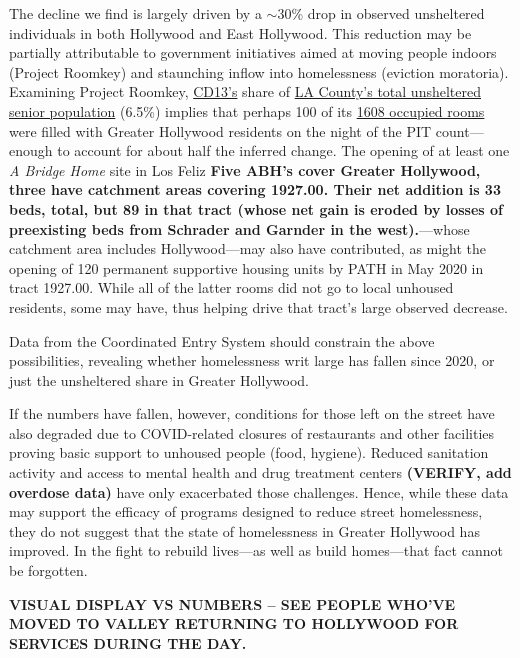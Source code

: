 \documentclass[11pt]{article}
\def\bfr{\bf\color{red}}
\begin{document}
 The decline we find is largely driven by a $\sim$30\% drop in observed 
unsheltered individuals in both Hollywood and East Hollywood. This reduction may be partially attributable to 
government initiatives aimed at moving people indoors (Project Roomkey) and staunching inflow into homelessness 
(eviction moratoria). Examining Project Roomkey, \href{https://www.lahsa.org/documents?id=4672-2020-homeless-count-council-district-13}
{CD13's} share of \href{https://www.lahsa.org/documents?id=4585-2020-greater-los-angeles-homeless-count-los-angeles-continuum-of-care-coc-}{LA County's total unsheltered senior population} (6.5\%) implies that perhaps 100 of its 
\href{https://projectroomkeytracker.com/}{1608 occupied rooms} were filled with Greater Hollywood 
residents on the night of the PIT count---enough to account for about half the inferred change. 
The opening of at least one {\it A Bridge Home} site in Los Feliz {\bfr Five ABH's cover Greater Hollywood,
three have catchment areas covering 1927.00. Their net addition is 33 beds, total, but 89 in that tract (whose
net gain is eroded by losses of preexisting beds from Schrader and Garnder in the west).}---whose 
catchment area includes Hollywood---may 
also have contributed, as might the opening of 120 permanent supportive housing units by PATH in May 2020 
in tract 1927.00. While all of the latter rooms did not go to local unhoused residents, some may have, thus 
helping drive that tract's large observed decrease. 

Data from the Coordinated Entry System should constrain the above possibilities, revealing whether homelessness 
writ large has fallen since 2020, or just the unsheltered share in Greater Hollywood.

If the numbers have fallen, however, conditions for those left on the street have also degraded due to COVID-related 
closures of restaurants and other facilities proving basic support to unhoused people (food, hygiene). Reduced sanitation 
activity and access to mental health and drug treatment centers {\bfr (VERIFY, add overdose data)} have only exacerbated those challenges. 
Hence, while these data may support the efficacy of programs designed to reduce street homelessness, they do not suggest 
that the state of homelessness in Greater Hollywood has improved. In the fight to rebuild lives---as well as build homes---that fact 
cannot be forgotten.

{\bfr VISUAL DISPLAY VS NUMBERS -- SEE PEOPLE WHO'VE MOVED TO VALLEY RETURNING 
TO HOLLYWOOD FOR SERVICES DURING THE DAY.}
\end{document}
